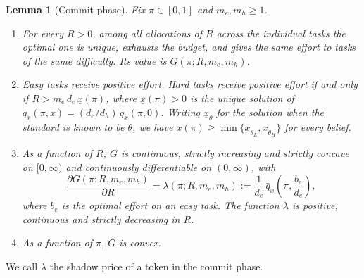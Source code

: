 \documentclass[11pt]{article}
\newtheorem{lemma}{Lemma}
\theoremstyle{definition}
\begin{document}
\begin{lemma}[Commit phase]\label{lem:commit}
Fix $\pi\in[0,1]$ and $m_e,m_h\ge1$.
\begin{enumerate}
\item[(i)] For every $R>0$, among all allocations of $R$ across the individual tasks the optimal one is unique, exhausts the budget, and gives the same effort to tasks of the same difficulty. Its value is $G(\pi;R,m_e,m_h)$.
\item[(ii)] Easy tasks receive positive effort. Hard tasks receive positive effort if and only if $R>m_e\,d_e\,\underline x(\pi)$, where $\underline x(\pi)>0$ is the unique solution of $\bar q_x(\pi,x)=(d_e/d_h)\,\bar q_x(\pi,0)$. Writing $\underline x_\theta$ for the solution when the standard is known to be $\theta$, we have $\underline x(\pi)\ge\min\{\underline x_{\theta_L},\underline x_{\theta_H}\}$ for every belief.
\item[(iii)] As a function of $R$, $G$ is continuous, strictly increasing and strictly concave on $[0,\infty)$ and continuously differentiable on $(0,\infty)$, with
\[
\frac{\partial G(\pi;R,m_e,m_h)}{\partial R}=\lambda(\pi;R,m_e,m_h):=\frac{1}{d_e}\,\bar q_x\!\left(\pi,\frac{b_e}{d_e}\right),
\]
where $b_e$ is the optimal effort on an easy task. The function $\lambda$ is positive, continuous and strictly decreasing in $R$.
\item[(iv)] As a function of $\pi$, $G$ is convex.
\end{enumerate}
\end{lemma}

We call $\lambda$ the shadow price of a token in the commit phase.
\end{document}
